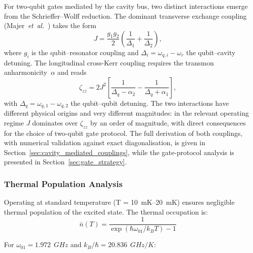 For two-qubit gates mediated by the cavity bus, two distinct interactions
emerge from the Schrieffer--Wolff reduction. The dominant transverse exchange
coupling (Majer~\textit{et~al.}~\cite{Majer2007}) takes the form
\begin{equation}
J = \frac{g_1 g_2}{2}\!\left(\frac{1}{\Delta_1}+\frac{1}{\Delta_2}\right),
\label{eq:transverse_J_intro}
\end{equation}
where $g_i$ is the qubit--resonator coupling and
$\Delta_i = \omega_{q,i}-\omega_r$ the qubit--cavity detuning. The
longitudinal cross-Kerr coupling requires the transmon anharmonicity~$\alpha$
and reads~\cite{blais2021circuit}
\begin{equation}
\zeta_{zz} = 2J^{2}\!\left[\frac{1}{\Delta_q-\alpha_2}-\frac{1}{\Delta_q+\alpha_1}\right],
\label{eq:cross_kerr_intro}
\end{equation}
with $\Delta_q = \omega_{q,1}-\omega_{q,2}$ the qubit--qubit detuning. The
two interactions have different physical origins and very different
magnitudes: in the relevant operating regime $J$ dominates over $\zeta_{zz}$
by an order of magnitude, with direct consequences for the choice of
two-qubit gate protocol. The full derivation of both couplings, with
numerical validation against exact diagonalisation, is given in
Section~\ref{sec:cavity_mediated_couplings}, while the gate-protocol
analysis is presented in Section~\ref{sec:gate_strategy}.

\subsubsection{Thermal Population Analysis}
\label{sec:thermal_analysis}

Operating at standard temperature (T = \SIrange{10}{20}{ mK})  ensures negligible thermal population of the excited state. The thermal occupation is:
\begin{equation}
\bar{n}(T) = \frac{1}{\exp(\hbar\omega_{01}/k_B T) - 1}
\label{eq:thermal}
\end{equation}

For $\omega_{01} = \SI{1.972}{~GHz}$ and $k_B/\hbar = \SI{20.836}{~GHz/K}$:

